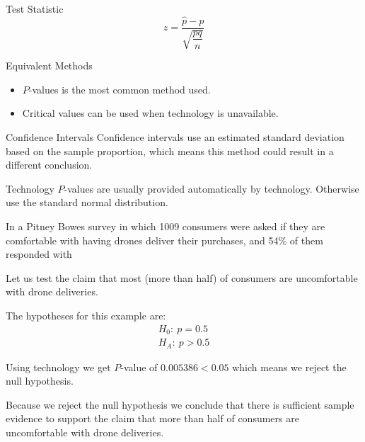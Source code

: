\documentclass{beamer}
\newcommand{\nullhypothesis}[1]{H_0:~{#1}}
\newcommand{\althypothesis}[1]{H_A:~{#1}}
\begin{document}
\begin{frame}
\begin{block}{Test Statistic}
\begin{equation*}
z=\dfrac{\hat{p}-p}{\sqrt{\dfrac{pq}{n}}}
\end{equation*}
\end{block}\pause

\begin{block}{Equivalent Methods}
\begin{itemize}
\item $P$-values is the most common method used.\pause
\item Critical values can be used when technology is unavailable.
\end{itemize}
\end{block}\pause

\begin{block}{Confidence Intervals}
Confidence intervals use an estimated standard deviation based on the sample proportion, which means this method could result in a different conclusion.
\end{block}\pause

\begin{block}{Technology}
$P$-values are usually provided automatically by technology. Otherwise use the standard normal distribution.
\end{block}
\end{frame}

\begin{frame}
\begin{example}
In a Pitney Bowes survey in which 1009 consumers were asked if they are comfortable with having drones deliver their purchases, and 54\% of them responded with \pause

\vspace{1mm}
Let us test the claim that most (more than half) of consumers are uncomfortable with drone deliveries.\pause

\vspace{1mm}
The hypotheses for this example are:
\begin{equation*}
\begin{aligned}
\nullhypothesis{p=0.5} \\
\althypothesis{p>0.5}
\end{aligned}
\end{equation*}\pause

Using technology we get $P$-value of $0.005386<0.05$ which means we reject the null hypothesis.\pause

\vspace{1mm}
Because we reject the null hypothesis we conclude that there is sufficient sample evidence to support the claim that more than half of consumers are uncomfortable with drone deliveries.
\end{example}
\end{frame}
\end{document}
